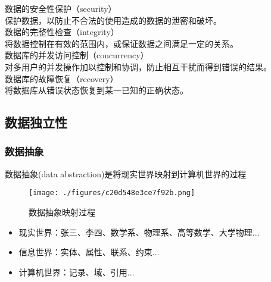 \begin{enumerate}
\begin{itemize}
数据的安全性保护（security）\\
保护数据，以防止不合法的使用造成的数据的泄密和破坏。\\

数据的完整性检查（integrity）\\
将数据控制在有效的范围内，或保证数据之间满足一定的关系。\\

数据库的并发访问控制（concurrency）\\
对多用户的并发操作加以控制和协调，防止相互干扰而得到错误的结果。\\

数据库的故障恢复（recovery）\\
将数据库从错误状态恢复到某一已知的正确状态。\\

\end{itemize}
\end{enumerate}

\subsection{数据独立性}
\subsubsection{数据抽象} 
数据抽象(data abstraction)是将现实世界映射到计算机世界的过程
\begin{figure}[ht]
\centering
\texttt{[image: ./figures/c20d548e3ce7f92b.png]}
\caption{数据抽象映射过程} \label{fig_DBS001_1}
\end{figure}
\begin{itemize}
\item 现实世界：张三、李四、数学系、物理系、高等数学、大学物理...\\
\item 信息世界：实体、属性、联系、约束...\\
\item 计算机世界：记录、域、引用...\\
\end{itemize}

